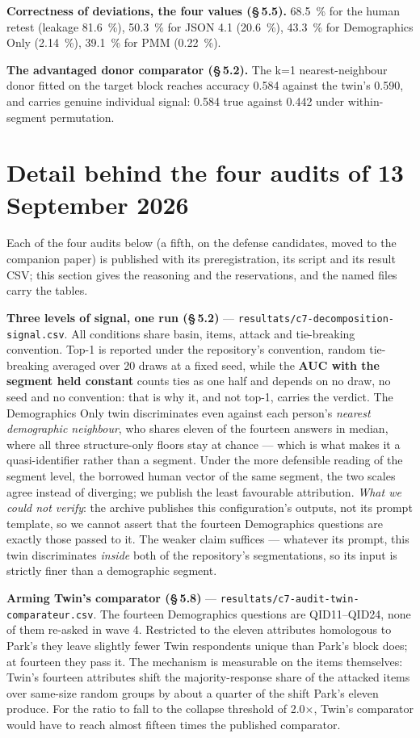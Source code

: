 \documentclass[sigconf,anonymous,review]{acmart}
\begin{document}
\textbf{Correctness of deviations, the four values (\S\,5.5).} 68.5~\% for the human retest (leakage 81.6~\%), 50.3~\% for JSON 4.1 (20.6~\%), 43.3~\% for Demographics Only (2.14~\%), 39.1~\% for PMM (0.22~\%).

\textbf{The advantaged donor comparator (\S\,5.2).} The k=1 nearest-neighbour donor fitted on the target block reaches accuracy 0.584 against the twin's 0.590, and carries genuine individual signal: 0.584 true against 0.442 under within-segment permutation.

\section{Detail behind the four audits of 13 September 2026}

Each of the four audits below (a fifth, on the defense candidates, moved to the companion paper) is published with its preregistration, its script and its result CSV; this section gives the reasoning and the reservations, and the named files carry the tables.

\textbf{Three levels of signal, one run (\S\,5.2)} --- \texttt{resultats/\allowbreak{}c7-\allowbreak{}decomposition-\allowbreak{}signal\allowbreak{}.csv}. All conditions share basin, items, attack and tie-breaking convention. Top-1 is reported under the repository's convention, random tie-breaking averaged over 20 draws at a fixed seed, while the \textbf{AUC with the segment held constant} counts ties as one half and depends on no draw, no seed and no convention: that is why it, and not top-1, carries the verdict. The Demographics Only twin discriminates even against each person's \textit{nearest demographic neighbour}, who shares eleven of the fourteen answers in median, where all three structure-only floors stay at chance --- which is what makes it a quasi-identifier rather than a segment. Under the more defensible reading of the segment level, the borrowed human vector of the same segment, the two scales agree instead of diverging; we publish the least favourable attribution. \textit{What we could not verify}: the archive publishes this configuration's outputs, not its prompt template, so we cannot assert that the fourteen Demographics questions are exactly those passed to it. The weaker claim suffices --- whatever its prompt, this twin discriminates \textit{inside} both of the repository's segmentations, so its input is strictly finer than a demographic segment.

\textbf{Arming Twin's comparator (\S\,5.8)} --- \texttt{resultats/\allowbreak{}c7-\allowbreak{}audit-\allowbreak{}twin-\allowbreak{}comparateur\allowbreak{}.csv}. The fourteen Demographics questions are QID11--QID24, none of them re-asked in wave 4. Restricted to the eleven attributes homologous to Park's they leave slightly fewer Twin respondents unique than Park's block does; at fourteen they pass it. The mechanism is measurable on the items themselves: Twin's fourteen attributes shift the majority-response share of the attacked items over same-size random groups by about a quarter of the shift Park's eleven produce. For the ratio to fall to the collapse threshold of 2.0$\times$, Twin's comparator would have to reach almost fifteen times the published comparator.
\end{document}
